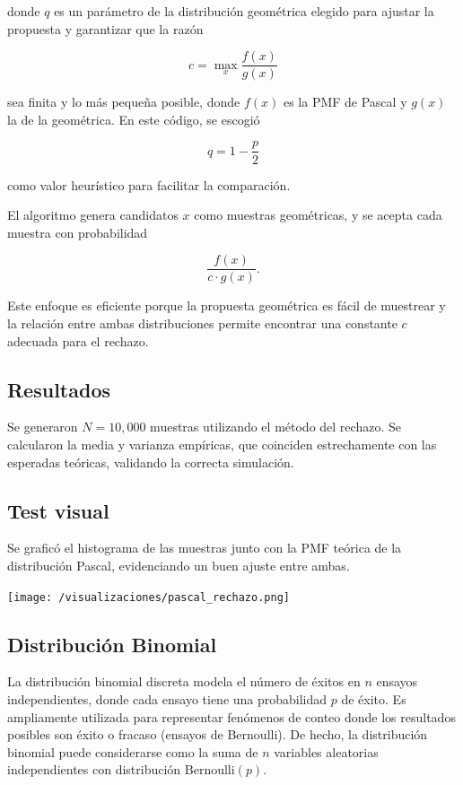 \documentclass{article}
\begin{document}
donde $q$ es un parámetro de la distribución geométrica elegido para ajustar la propuesta y garantizar que la razón

\[
c = \max_x \frac{f(x)}{g(x)}
\]

sea finita y lo más pequeña posible, donde $f(x)$ es la PMF de Pascal y $g(x)$ la de la geométrica. En este código, se escogió

\[
q = 1 - \frac{p}{2}
\]

como valor heurístico para facilitar la comparación.

El algoritmo genera candidatos $x$ como muestras geométricas, y se acepta cada muestra con probabilidad

\[
\frac{f(x)}{c \cdot g(x)}.
\]

Este enfoque es eficiente porque la propuesta geométrica es fácil de muestrear y la relación entre ambas distribuciones permite encontrar una constante $c$ adecuada para el rechazo.

\subsection{Resultados}

Se generaron $N=10{,}000$ muestras utilizando el método del rechazo. Se calcularon la media y varianza empíricas, que coinciden estrechamente con las esperadas teóricas, validando la correcta simulación.

\subsection{Test visual}

Se graficó el histograma de las muestras junto con la PMF teórica de la distribución Pascal, evidenciando un buen ajuste entre ambas.

\begin{center}
    \texttt{[image: /visualizaciones/pascal\_rechazo.png]}
\end{center}

\subsection{Distribución Binomial}

La distribución binomial discreta modela el número de éxitos en $n$ ensayos independientes, donde cada ensayo tiene una probabilidad $p$ de éxito. Es ampliamente utilizada para representar fenómenos de conteo donde los resultados posibles son éxito o fracaso (ensayos de Bernoulli). De hecho, la distribución binomial puede considerarse como la suma de $n$ variables aleatorias independientes con distribución Bernoulli$(p)$.
\end{document}
